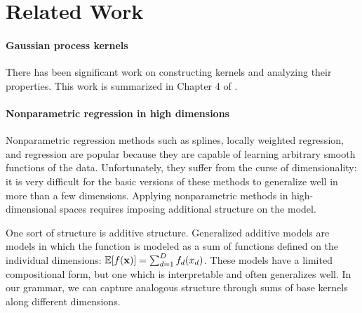 \documentclass[twoside]{article}
\begin{document}
\section{Related Work}
\label{sec:related_work}


\paragraph{Gaussian process kernels} There has been significant work on constructing \gp{} kernels and analyzing their properties. This work is summarized in Chapter 4 of \cite{rasmussen38gaussian}. 

\paragraph{Nonparametric regression in high dimensions} Nonparametric regression methods such as splines, locally weighted regression, and \gp{} regression are popular because they are capable of learning arbitrary smooth functions of the data. Unfortunately, they suffer from the curse of dimensionality: it is very difficult for the basic versions of these methods to generalize well in more than a few dimensions. Applying nonparametric methods in high-dimensional spaces requires imposing additional structure on the model.

One sort of structure is additive structure. Generalized additive models \cite{hastie1990generalized} are models in which the function is modeled as a sum of functions defined on the individual dimensions: $\mathbb{E}[f({\bf{x}})] = \sum_{d=1}^D f_d(x_d)$. These models have a limited compositional form, but one which is interpretable and often generalizes well. In our grammar, we can capture analogous structure through sums of base kernels along different dimensions.
\end{document}
